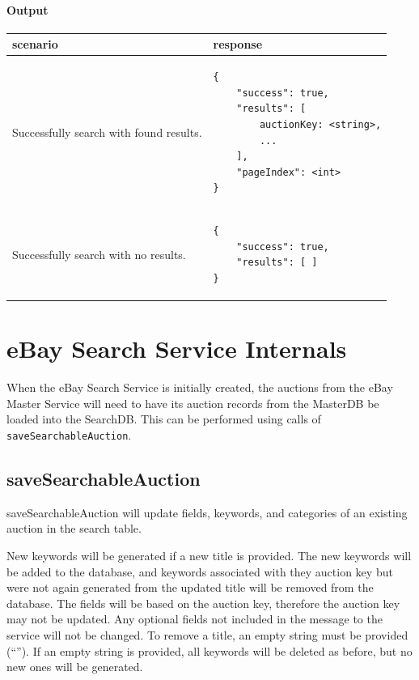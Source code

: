 \documentclass[12pt,a4paper]{article}
\begin{document}
\paragraph{Output}
\begin{center}
    \begin{tabular}{| p{7cm} | l |}
        \hline
        \textbf{scenario} & \textbf{response} \\
        \hline
        Successfully search with found results. &
        \begin{lstlisting}[language=tablejson,firstnumber=1]
{
    "success": true,
    "results": [ 
        auctionKey: <string>,
        ...
    ],
    "pageIndex": <int>
}
        \end{lstlisting} \\ 
        \hline
 \hline
        Successfully search with no results. &
        \begin{lstlisting}[language=tablejson,firstnumber=1]
{
    "success": true,
    "results": [ ]
}
         \end{lstlisting} \\ 
         \hline
    \end{tabular}
\end{center}

\pagebreak
\section{eBay Search Service Internals}

When the eBay Search Service is initially created, the auctions from 
the eBay Master Service will need to have its auction records from the MasterDB
be loaded into the SearchDB. This can be performed using calls of \texttt{saveSearchableAuction}.

\subsection{saveSearchableAuction}

saveSearchableAuction will update fields, keywords, and categories of an
existing auction in the search table.

New keywords will be generated if a new title is provided. The new keywords
will be added to the database, and keywords associated with they auction key
but were not again generated from the updated title will be removed from the
database. The fields will be based on the auction key, therefore the auction
key may not be updated. Any optional fields not included in the message to the
service will not be changed. To remove a title, an empty string must be
provided (``''). If an empty string is provided, all keywords will be deleted
as before, but no new ones will be generated.
\end{document}

